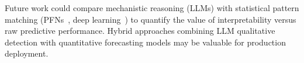 Future work could compare mechanistic reasoning (LLMs) with statistical pattern matching (PFNs~\cite{muller2021pfn}, deep learning~\cite{hochreiter1997lstm,vaswani2017attention}) to quantify the value of interpretability versus raw predictive performance. Hybrid approaches combining LLM qualitative detection with quantitative forecasting models may be valuable for production deployment.


